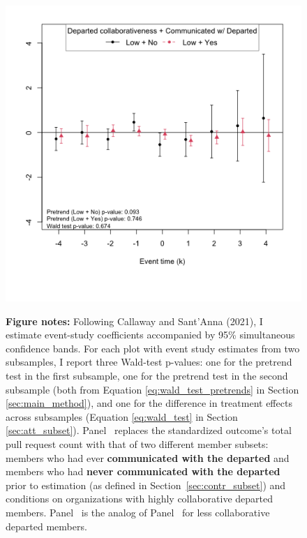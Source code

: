 \begin{figure}[htbp]
\begin{minipage}[b]{0.49\textwidth}
        \includegraphics[width=\textwidth]{temp/output/collab/cs_norm_prs_opened_dept_never_comm_predep_Low.png}
    \end{minipage}
    
  \begin{minipage}{1\textwidth}
    \textbf{Figure notes:} 
    Following Callaway and Sant’Anna (2021), I estimate event-study coefficients accompanied by 95\% simultaneous confidence bands. For each plot with event study estimates from two subsamples, I report three Wald-test p-values: one for the pretrend test in the first subsample, one for the pretrend test in the second subsample (both from Equation \ref{eq:wald_test_pretrends} in Section \ref{sec:main_method}), and one for the difference in treatment effects across subsamples (Equation \ref{eq:wald_test} in Section \ref{sec:att_subset}). 
    Panel~ replaces the standardized outcome’s total pull request count with that of two different member subsets: members who had ever \textbf{communicated with the departed} and members who had \textbf{never communicated with the departed} prior to estimation (as defined in Section~\ref{sec:contr_subset}) and conditions on organizations with highly collaborative departed members.
    Panel~ is the analog of Panel~ for less collaborative departed members.  
  \end{minipage}
  

\end{figure}
